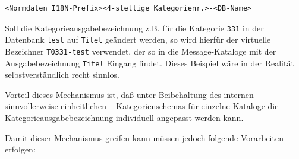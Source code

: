 \documentclass[11pt, twoside, a4paper, BCOR8mm, DIV12, bibtotoc,idxtotoc]{scrbook}
\begin{document}
\begin{verbatim}
<Normdaten I18N-Prefix><4-stellige Kategorienr.>-<DB-Name>
\end{verbatim}

Soll die Kategorieausgabebezeichnung z.B. für die Kategorie
\texttt{331} in der Datenbank \texttt{test} auf \texttt{Titel}
geändert werden, so wird hierfür der virtuelle Bezeichner
\texttt{T0331-test} verwendet, der so in die Message-Kataloge mit der
Ausgabebezeichnung \texttt{Titel} Eingang findet. Dieses Beispiel wäre
in der Realität selbst\-verständlich recht sinnlos.

Vorteil dieses Mechanismus ist, daß unter Beibehaltung des internen --
sinnvollerweise einheitlichen -- Kategorienschemas für einzelne
Kataloge die Kategorieausgabebezeichnung individuell angepasst werden
kann.

Damit dieser Mechanismus greifen kann müssen jedoch folgende
Vorarbeiten erfolgen:
\end{document}
